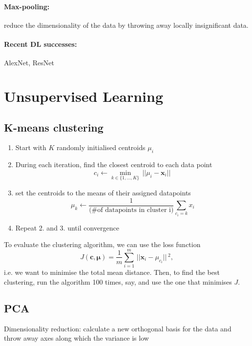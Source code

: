 \documentclass{article}
\renewcommand{\vec}[1]{\mathbf{#1}}
\renewcommand{\|}{\,\,|\,\,}
\newcommand{\norm}[1]{\,||#1||\,}
\begin{document}
\paragraph{Max-pooling:} reduce the dimensionality of the data by throwing away
locally insignificant data.
\paragraph{Recent DL successes:} AlexNet, ResNet
\section{Unsupervised Learning}
\subsection{K-means clustering}
\begin{enumerate}
\item Start with $K$ randomly initialised centroids $\mu_i$
\item During each iteration, find the closest centroid to each data point
  \[
    c_i \leftarrow \min_{k \in \{1,\hdots, K\}} \norm{\mu_i - \vec{x}_i}
  \]
\item set the centroids to the means of their assigned datapoints
  \[
    \mu_k \leftarrow \frac{1}{\text{(\# of datapoints in cluster i)}} \sum_{c_i
      = k} x_i
  \]
\item Repeat 2. and 3. until convergence
\end{enumerate}
To evaluate the clustering algorithm, we can use the loss function
\[
  J(\vec{c}, \vec{\mu}) = \frac{1}{m} \sum_{i = 1}^m \norm{\vec{x}_i - \mu_{c_i}}^2,
\]
i.e. we want to minimise the total mean distance.
Then, to find the best clustering, run the algorithm 100 times, say, and use the
one that minimises $J$.
\subsection{PCA}
Dimensionality reduction: calculate a new orthogonal basis for the data and
throw away axes along which the variance is low
\end{document}
